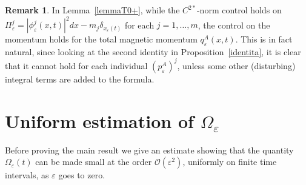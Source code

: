 \documentclass[11pt]{amsart}
\numberwithin{equation}{section}
\theoremstyle{definition}
\newtheorem{remark}[theorem]{Remark}
\begin{document}
\begin{remark}
In Lemma~\ref{lemmaT0+}, while the $C^{2*}$-norm control holds on  $\Pi_{\varepsilon}^j=|\phi_{\varepsilon}^j(x,t)|^2dx-m_j\delta_{x_{\varepsilon}(t)}$
for each $j=1,\dots,m$, the control on the momentum holds for the total
magnetic momentum $q_{\varepsilon}^{A}(x,t)$. This is in fact natural, since looking
at the second identity in Proposition~\ref{identita}, it is clear that
it cannot hold for each individual $(p_{\varepsilon}^A)^j$, unless some other (disturbing)
integral terms are added to the formula.
\end{remark}

\section{Uniform estimation of $\Omega_{\varepsilon}$}
\label{error-estimate}

Before proving the main result we give an estimate
showing that the quantity $\Omega_{\varepsilon}(t)$ can be made small at
the order ${\mathcal O}({\varepsilon}^2)$, uniformly on finite
time intervals, as ${\varepsilon}$ goes to zero.
\end{document}
